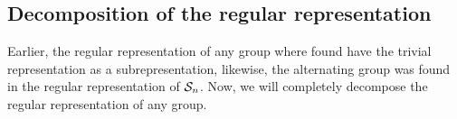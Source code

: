 

\subsection{Decomposition of the regular representation}

Earlier, the regular representation of any group where found have the trivial representation as a subrepresentation, likewise, the alternating group was found in the regular representation of $\mathcal{S}_n$. Now, we will completely decompose the regular representation of any group.

